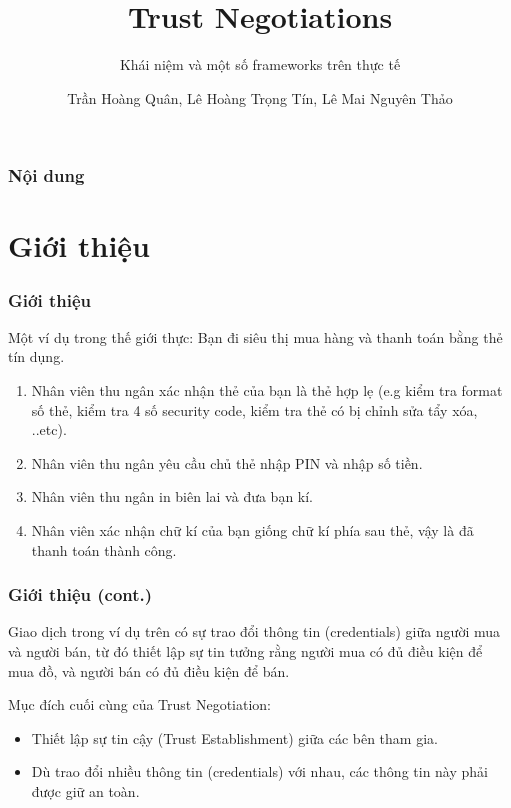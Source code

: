 \documentclass[11pt]{beamer}
\begin{document}
\author{Trần Hoàng Quân, Lê Hoàng Trọng Tín, Lê Mai Nguyên Thảo}
\title{Trust Negotiations}
\subtitle{Khái niệm và một số frameworks trên thực tế}
\begin{frame}[plain]
\maketitle
\end{frame}

\begin{frame}
\frametitle{Nội dung}
\tableofcontents
\end{frame}

\section{Giới thiệu}
\begin{frame}
\frametitle{Giới thiệu}
Một ví dụ trong thế giới thực: Bạn đi siêu thị mua hàng và thanh toán bằng thẻ tín dụng.
\begin{enumerate}
\item Nhân viên thu ngân xác nhận thẻ của bạn là thẻ hợp lẹ (e.g kiểm tra format số thẻ, kiểm tra 4 số security code, kiểm tra thẻ có bị chỉnh sửa tẩy xóa, ..etc).
\item Nhân viên thu ngân yêu cầu chủ thẻ nhập PIN và nhập số tiền.
\item Nhân viên thu ngân in biên lai và đưa bạn kí.
\item Nhân viên xác nhận chữ kí của bạn giống chữ kí phía sau thẻ, vậy là đã thanh toán thành công.
\end{enumerate}
\end{frame}

\begin{frame}
\frametitle{Giới thiệu (cont.)}
Giao dịch trong ví dụ trên có sự trao đổi thông tin (credentials) giữa người mua và người bán, từ đó thiết lập sự tin tưởng rằng người mua có đủ điều kiện để mua đồ, và người bán có đủ điều kiện để bán.

Mục đích cuối cùng của Trust Negotiation:
\begin{itemize}
\item Thiết lập sự tin cậy (Trust Establishment) giữa các bên tham gia.
\item Dù trao đổi nhiều thông tin (credentials) với nhau, các thông tin này phải được giữ an toàn.
\end{itemize}
\end{frame}
\end{document}
